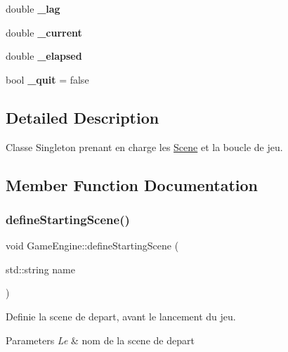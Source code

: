 \begin{DoxyCompactItemize}
double {\bfseries \+\_\+lag}
\item 
\hypertarget{class_game_engine_a27abc89c39a79dd719084c2a9267d61d}{}\label{class_game_engine_a27abc89c39a79dd719084c2a9267d61d} 
double {\bfseries \+\_\+current}
\item 
\hypertarget{class_game_engine_a0a2ef0a08be4b7ac9f02e7db06f0bb50}{}\label{class_game_engine_a0a2ef0a08be4b7ac9f02e7db06f0bb50} 
double {\bfseries \+\_\+elapsed}
\item 
\hypertarget{class_game_engine_a6f8d9c72d09c8894b8ccbad014376285}{}\label{class_game_engine_a6f8d9c72d09c8894b8ccbad014376285} 
bool {\bfseries \+\_\+quit} = false
\end{DoxyCompactItemize}


\subsection{Detailed Description}
Classe Singleton prenant en charge les \hyperlink{class_scene}{Scene} et la boucle de jeu. 

\subsection{Member Function Documentation}
\hypertarget{class_game_engine_aba1c35007c56a3082102f67c08ea5580}{}\label{class_game_engine_aba1c35007c56a3082102f67c08ea5580} 
\subsubsection{\texorpdfstring{define\+Starting\+Scene()}{defineStartingScene()}\hspace{0.1cm}{\footnotesize\ttfamily [1/2]}}
{\footnotesize\ttfamily void Game\+Engine\+::define\+Starting\+Scene (\begin{DoxyParamCaption}\item[{std\+::string}]{name }\end{DoxyParamCaption})}



Definie la scene de depart, avant le lancement du jeu. 


\begin{DoxyParams}{Parameters}
{\em Le} & nom de la scene de depart \\
\hline
\end{DoxyParams}
\hypertarget{class_game_engine_ad2bb379da2ce51978a989de4ca979ecb}{}\label{class_game_engine_ad2bb379da2ce51978a989de4ca979ecb} 

